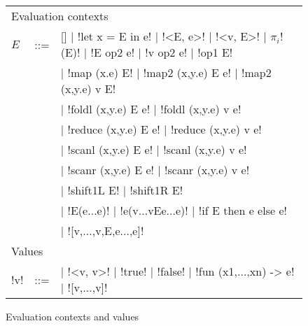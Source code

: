 \begin{figure*}[t]
    \begin{tabular}{|l c l|}
        \hline
        \multicolumn{3}{|l|}{Evaluation contexts} \\
        $E$ & \mbox{::=} & 
        [] 
        $\mid$ !let x = E in e! 
        $\mid$ !<E, e>!
        $\mid$ !<v, E>!
        $\mid$ $\pi_i$!(E)!
        $\mid$ !E op2 e!
        $\mid$ !v op2 e!
        $\mid$ !op1 E! \\
        && $\mid$ !map (x.e) E!
        $\mid$ !map2 (x,y.e) E e!
        $\mid$ !map2 (x,y.e) v E! \\
        && $\mid$ !foldl (x,y.e) E e!
        $\mid$ !foldl (x,y.e) v e! \\
        && $\mid$ !reduce (x,y.e) E e! 
        $\mid$ !reduce (x,y.e) v e! \\
        && $\mid$ !scanl (x,y.e) E e!
        $\mid$ !scanl (x,y.e) v e! \\
        && $\mid$ !scanr (x,y.e) E e!
        $\mid$ !scanr (x,y.e) v e! \\
        && $\mid$ !shift1L E! $\mid$ !shift1R E! \\
        && $\mid$ !E(e$\ldots$e)!
        $\mid$ !e(v$\ldots$vEe$\ldots$e)!
        $\mid$ !if E then e else e! \\
        && $\mid$ ![v,$\ldots$,v,E,e$\ldots$,e]!
        \\ \hline
        \multicolumn{3}{|l|}{Values} \\ 
        !v! & \mbox{::=} & 
        \cnst{}  
        $\mid$ !<v, v>!
        $\mid$ !true! 
        $\mid$ !false!
        $\mid$ !fun (x1,$\ldots$,xn) -> e!
        $\mid$ ![v,$\ldots$,v]! 
        \\ \hline
        \end{tabular}
    \caption{Evaluation contexts and values}
\label{fig:ev_contexts}    
\end{figure*}